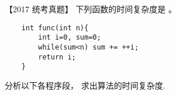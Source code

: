 \begin{questions}[tr]
    \begin{bbox}
 
        \question   【2017 统考真题】 下列函数的时间复杂度是 \blankbox 。
        \begin{lstlisting}
    int func(int n){
        int i=0, sum=0;
        while(sum<n) sum += ++i;
        return i;
    }
        \end{lstlisting}
    \end{bbox}

    
    \begin{bbox}
        \question   分析以下各程序段， 求出算法的时间复杂度.

    \end{bbox}



    
        

\end{questions}

